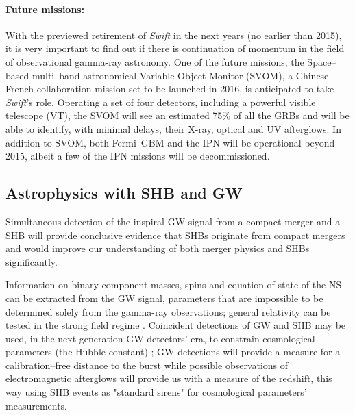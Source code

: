 \paragraph{Future missions:}
With the previewed retirement of \emph{Swift} in the next years (no earlier than 2015), it is very important to find out if there is continuation of momentum in the field of observational gamma-ray astronomy. One of the future missions, the Space--based multi--band astronomical Variable Object Monitor (SVOM), a Chinese--French collaboration mission \cite{Schanne:2010fu} set to be launched in 2016, is anticipated to take \emph{Swift}'s role. Operating a set of four detectors, including a powerful visible telescope (VT), the SVOM will see an estimated 75$\%$ of all the GRBs and will be able to identify, with minimal delays, their X-ray, optical and UV afterglows. In addition to SVOM, both Fermi--GBM and the IPN will be operational beyond 2015, albeit a few of the IPN missions will be decommissioned.   

\subsection{Astrophysics with SHB and GW}
\label{importanceGWSHB}
Simultaneous detection of the inspiral GW signal from a compact merger and a SHB will provide conclusive evidence that SHBs originate from compact mergers and would improve our understanding of both merger physics and SHBs significantly. 

Information on binary component masses, spins and equation of state of the NS \cite{Kyutoku:2011vz} can be extracted from the GW signal, parameters that are impossible to be determined solely from the gamma-ray observations; general relativity can be tested in the strong field regime \cite{lrr-2006-3}. Coincident detections of GW and SHB may be used, in the next generation GW detectors' era, to constrain cosmological parameters (the Hubble constant) \cite{Dalal:2006qt}; GW detections will provide a measure for a calibration--free distance to the burst while possible observations of electromagnetic afterglows will provide us with a measure of the redshift, this way using SHB events as "standard sirens" for cosmological parameters' measurements.

